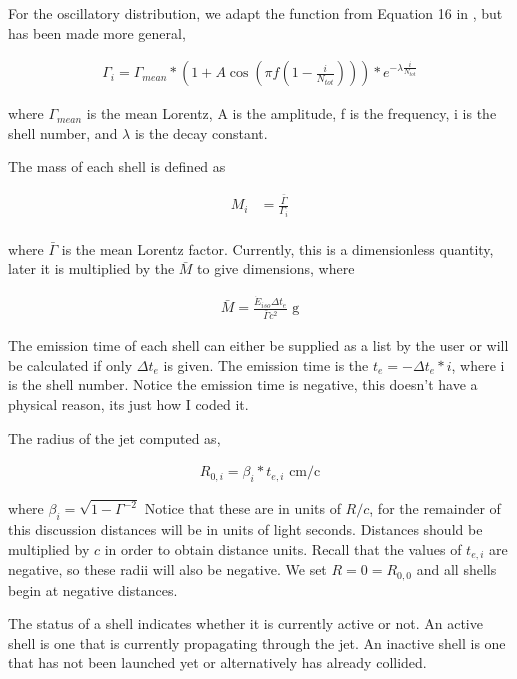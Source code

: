 \documentclass[linenumbers,twocolumn]{aastex631}
\begin{document}
For the oscillatory distribution, we adapt the function from Equation 16 in \citet{2013A&A...551A.124H}, but has been made more general,

\begin{align}
	\Gamma_i = \Gamma_{mean} * \left(1+A\cos\left(\pi f\left(1-\frac{i}{N_{tot}}\right)\right)\right)*e^{-\lambda \frac{i}{N_{tot}}} 
\end{align}

where $\Gamma_{mean}$ is the mean Lorentz, A is the amplitude, f is the frequency, i is the shell number, and $\lambda$ is the decay constant.

The mass of each shell is defined as

\begin{align}
	M_i &= \frac{\bar{\Gamma}}{\Gamma_i} \\ 
\end{align}

where $\bar{\Gamma}$ is the mean Lorentz factor. Currently, this is a dimensionless quantity, later it is multiplied by the $\bar{M}$ to give dimensions, where

\begin{align}
\bar{M} = \frac{\dot{E}_{iso} \Delta t_e}{\bar{\Gamma}c^2} \text{ g}
\end{align}

The emission time of each shell can either be supplied as a list by the user or will be calculated if only $\Delta t_e$ is given. The emission time is the $t_e = -\Delta t_e * i$, where i is the shell number. Notice the emission time is negative, this doesn't have a physical reason, its just how I coded it. 

The radius of the jet computed as,

\begin{align}
	R_{0,i} = \beta_i * t_{e,i}\text{ cm/c}
\end{align}

where $\beta_i = \sqrt{1 - \Gamma^{-2}}$ Notice that these are in units of $R/c$, for the remainder of this discussion distances will be in units of light seconds. Distances should be multiplied by $c$ in order to obtain distance units. Recall that the values of $t_{e,i}$ are negative, so these radii will also be negative. We set $R = 0 = R_{0,0}$ and all shells begin at negative distances.

The status of a shell indicates whether it is currently active or not. An active shell is one that is currently propagating through the jet. An inactive shell is one that has not been launched yet or alternatively has already collided. 
\end{document}
